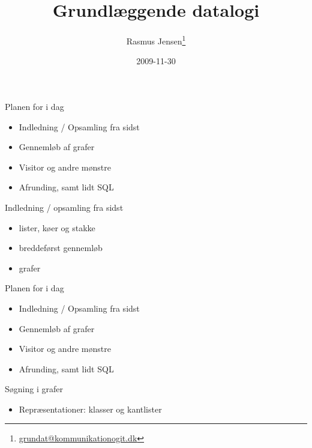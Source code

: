\documentclass[a4paper,landscape]{slides}
\title{Grundlæggende datalogi}
\author{Rasmus Jensen\footnote{\url{grundat@kommunikationogit.dk}}}
\date{2009-11-30}
\begin{document}
\maketitle

\begin{slide} \begin{center} {\large 
Planen for i dag
} \end{center} \begin{itemize} \addtolength{\itemsep}{-\baselineskip}
   \item Indledning / Opsamling fra sidst
   \item Gennemløb af grafer
   \item Visitor og andre mønstre
   \item Afrunding, samt lidt SQL
\end{itemize} \end{slide} \begin{slide} \begin{center} {\large 
        Indledning / opsamling fra sidst
} \end{center} \begin{itemize} \addtolength{\itemsep}{-\baselineskip}
       \item  lister, køer og stakke
       \item  breddeførst gennemløb
       \item  grafer
\end{itemize} \end{slide} \begin{slide} \begin{center} {\large 
Planen for i dag
} \end{center} \begin{itemize} \addtolength{\itemsep}{-\baselineskip}
   \item Indledning / Opsamling fra sidst
   \item Gennemløb af grafer
   \item Visitor og andre mønstre
   \item Afrunding, samt lidt SQL
\end{itemize} \end{slide} \begin{slide} \begin{center} {\large 
        Søgning i grafer
} \end{center} \begin{itemize} \addtolength{\itemsep}{-\baselineskip}
       \item  Repræsentationer: klasser og kantlister

\end{itemize}
\end{slide}
\end{document}
